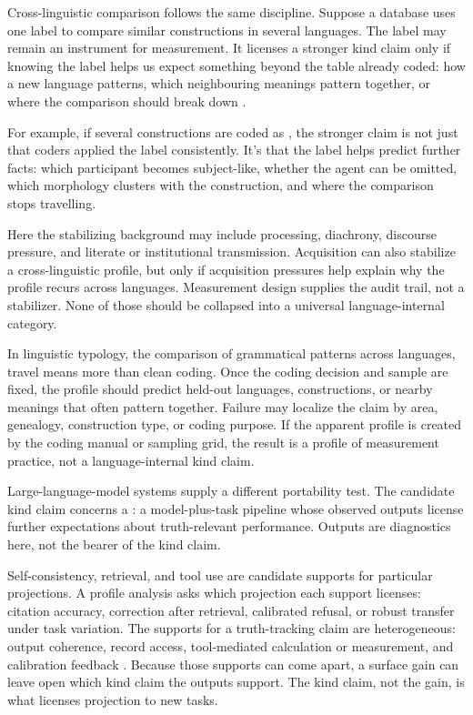 \documentclass[12pt]{article}
\begin{document}
Cross-linguistic comparison follows the same discipline. Suppose a database uses
one label to compare similar constructions in several languages. The label may
remain an instrument for measurement. It licenses a stronger kind claim only if
knowing the label helps us expect something beyond the table already coded: how a
new language patterns, which neighbouring meanings pattern together, or where the
comparison should break down \citep{reynolds2025comparanda}.

For example, if several constructions are coded as , the stronger
claim is not just that coders applied the label consistently. It's that the
label helps predict further facts: which participant becomes subject-like,
whether the agent can be omitted, which morphology clusters with the
construction, and where the comparison stops travelling.

Here the stabilizing background may include processing, diachrony, discourse
pressure, and literate or institutional transmission. Acquisition can also
stabilize a cross-linguistic profile, but only if acquisition pressures help
explain why the profile recurs across languages. Measurement design supplies the
audit trail, not a stabilizer. None of those should be collapsed into a universal
language-internal category.

In linguistic typology, the comparison of grammatical patterns across languages,
travel means more than clean coding. Once the coding decision and sample are
fixed, the profile should predict held-out languages, constructions, or nearby
meanings that often pattern together. Failure may localize the claim by area,
genealogy, construction type, or coding purpose. If the apparent profile is
created by the coding manual or sampling grid, the result is a profile of
measurement practice, not a language-internal kind claim.

Large\mbox{-}language\mbox{-}model systems supply a different portability test. The candidate
kind claim concerns a : a
model-plus-task pipeline whose observed outputs license further expectations
about truth-relevant performance. Outputs are diagnostics here, not the bearer
of the kind claim.

Self\mbox{-}consistency, retrieval, and tool use are candidate supports for
particular projections. A profile analysis asks which projection each support
licenses: citation accuracy, correction after retrieval, calibrated refusal, or
robust transfer under task variation. The supports for a
truth\mbox{-}tracking claim are heterogeneous: output coherence, record access,
tool-mediated calculation or measurement, and calibration feedback
\citep{reynolds2026truthTrackingProfiles}. Because those supports can come
apart, a surface gain can leave open which kind claim the outputs support. The
kind claim, not the gain, is what licenses projection to new tasks.
\end{document}
